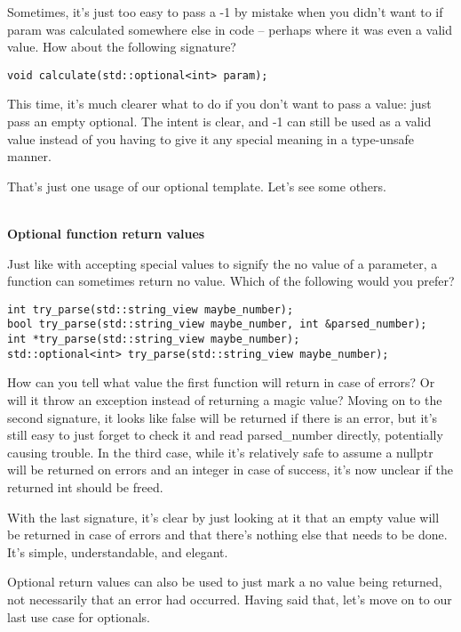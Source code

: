 Sometimes, it's just too easy to pass a -1 by mistake when you didn't want to if param was calculated somewhere else in code – perhaps where it was even a valid value. How about the following signature?

\begin{lstlisting}[style=styleCXX]
void calculate(std::optional<int> param);
\end{lstlisting}

This time, it's much clearer what to do if you don't want to pass a value: just pass an empty optional. The intent is clear, and -1 can still be used as a valid value instead of you having to give it any special meaning in a type-unsafe manner.

That's just one usage of our optional template. Let's see some others.

\hspace*{\fill} \\ %
\noindent
\textbf{Optional function return values}

Just like with accepting special values to signify the no value of a parameter, a function can sometimes return no value. Which of the following would you prefer?

\begin{lstlisting}[style=styleCXX]
int try_parse(std::string_view maybe_number);
bool try_parse(std::string_view maybe_number, int &parsed_number);
int *try_parse(std::string_view maybe_number);
std::optional<int> try_parse(std::string_view maybe_number);
\end{lstlisting}

How can you tell what value the first function will return in case of errors? Or will it throw an exception instead of returning a magic value? Moving on to the second signature, it looks like false will be returned if there is an error, but it's still easy to just forget to check it and read parsed\_number directly, potentially causing trouble. In the third case, while it's relatively safe to assume a nullptr will be returned on errors and an integer in case of success, it's now unclear if the returned int should be freed.

With the last signature, it's clear by just looking at it that an empty value will be returned in case of errors and that there's nothing else that needs to be done. It's simple, understandable, and elegant.

Optional return values can also be used to just mark a no value being returned, not necessarily that an error had occurred. Having said that, let's move on to our last use case for optionals.

